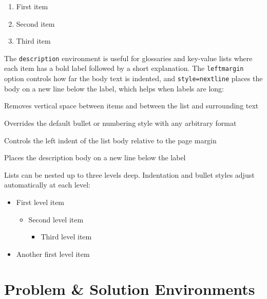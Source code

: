 \begin{enumerate}[label=(\alph*), noitemsep]
	\item First item
	\item Second item
	\item Third item
\end{enumerate}

The \texttt{description} environment is useful for glossaries and key-value lists where each item has a bold label followed by a short explanation. The \texttt{leftmargin} option controls how far the body text is indented, and \texttt{style=nextline} places the body on a new line below the label, which helps when labels are long:

\begin{description}[leftmargin=3cm, style=nextline]
	\item[\texttt{noitemsep}] Removes vertical space between items and between the list and surrounding text
	\item[\texttt{label}] Overrides the default bullet or numbering style with any arbitrary format
	\item[\texttt{leftmargin}] Controls the left indent of the list body relative to the page margin
	\item[\texttt{style=nextline}] Places the description body on a new line below the label
\end{description}

Lists can be nested up to three levels deep. Indentation and bullet styles adjust automatically at each level:

\begin{itemize}
	\item First level item
	\begin{itemize}[noitemsep]
		\item Second level item
		\begin{itemize}[noitemsep]
			\item Third level item
		\end{itemize}
	\end{itemize}
	\item Another first level item
\end{itemize}

\section{Problem \& Solution Environments}

